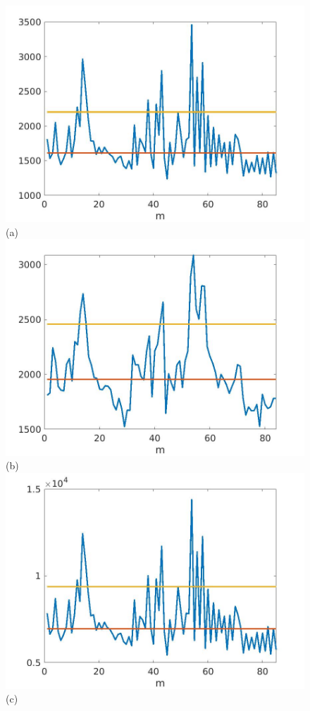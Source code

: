 \documentclass[journal]{IEEEtran}
\begin{document}
\begin{figure}[htp!]
\includegraphics[scale=.12]{../../figs/J1_VH_squared_meandev}(a)
\includegraphics[scale=.12]{../../figs/consecdif_J1_VH_squared_meandev}(b)\\
\includegraphics[scale=.12]{../../figs/J2_VH_squared_meandev}(c)

\end{figure}
\end{document}
